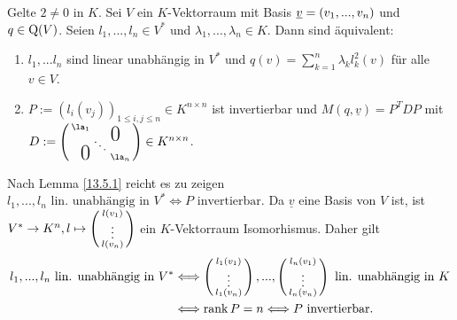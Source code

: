 \documentclass[../../main.tex]{subfiles}
\begin{document}
\begin{sat}\label{13.5.2}
Gelte $2\neq 0$ in $K$. Sei $V$ ein $K$-Vektorraum mit Basis ${\underline v}=(v_1,...,v_n)$ und $q\in \operatorname{Q}(V)$. Seien $l_1,...,l_n\in V^*$ und $\lambda_1,...,\lambda_n\in K$. Dann sind äquivalent:
\begin{enumerate}[\normalfont(a)]
\item $l_1,...l_n$ sind linear unabhängig in $V^*$ und $q(v)=\sum_{k=1}^n\lambda_k l_k^2(v)$ für alle $v\in V$.
\item $P:=(l_i(v_j))_{1\le i,j\le n}\in K^{n\times n}$ ist invertierbar und $M(q,\underline{v})=P^TDP$  mit $D:=\left(\begin{smallmatrix}
\la_1 & & \llap{$\overset{\blap{\LARGE 0}}{~}$} \\
& \ddots &\\
\rlap{\tlap{\LARGE 0}} & & \la_n\end{smallmatrix}\right)\in K^{n\times n}$.
\end{enumerate}
\end{sat}
\begin{cproof}
Nach Lemma \ref{13.5.1} reicht es zu zeigen $l_1,...,l_n\text{ lin. unabhängig in }V^*\Longleftrightarrow P\text{ invertierbar}$. Da $\underline{v}$ eine Basis von $V$ ist, ist $V^*\to K^n, l\mapsto\left(\begin{smallmatrix}l(v_1)\\\vdots\\l(v_n)\end{smallmatrix}\right)$ ein $K$-Vektorraum Isomorhismus. Daher gilt
\begin{align*}
l_1,...,l_n\text{ lin. unabhängig in }V^*&\Longleftrightarrow\left(\begin{smallmatrix}l_1(v_1)\\\vdots\\l_1(v_n)\end{smallmatrix}\right),...,\left(\begin{smallmatrix}l_n(v_1)\\\vdots\\l_n(v_n)\end{smallmatrix}\right) \text{ lin. unabhängig in }K\\
&\Longleftrightarrow \operatorname{rank} P=n\Longleftrightarrow P\text{ invertierbar}.
\end{align*}
\end{cproof}
\end{document}
